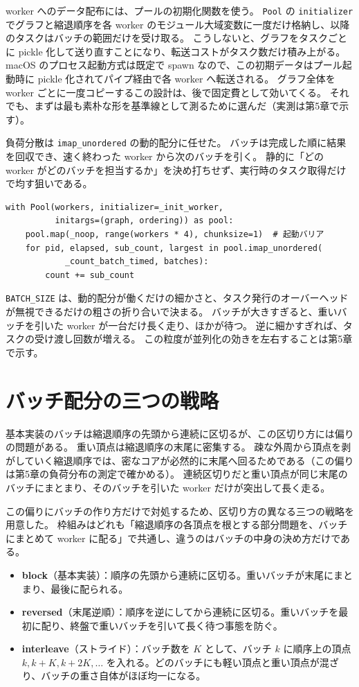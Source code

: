 worker へのデータ配布には、プールの初期化関数を使う。
\verb|Pool| の \verb|initializer| でグラフと縮退順序を各 worker のモジュール大域変数に一度だけ格納し、以降のタスクはバッチの範囲だけを受け取る。
こうしないと、グラフをタスクごとに pickle 化して送り直すことになり、転送コストがタスク数だけ積み上がる。
macOS のプロセス起動方式は既定で spawn なので、この初期データはプール起動時に pickle 化されてパイプ経由で各 worker へ転送される。
グラフ全体を worker ごとに一度コピーするこの設計は、後で固定費として効いてくる。
それでも、まずは最も素朴な形を基準線として測るために選んだ（実測は第5章で示す）。

負荷分散は \verb|imap_unordered| の動的配分に任せた。
バッチは完成した順に結果を回収でき、速く終わった worker から次のバッチを引く。
静的に「どの worker がどのバッチを担当するか」を決め打ちせず、実行時のタスク取得だけで均す狙いである。

\begin{verbatim}
with Pool(workers, initializer=_init_worker,
          initargs=(graph, ordering)) as pool:
    pool.map(_noop, range(workers * 4), chunksize=1)  # 起動バリア
    for pid, elapsed, sub_count, largest in pool.imap_unordered(
            _count_batch_timed, batches):
        count += sub_count
\end{verbatim}

\verb|BATCH_SIZE| は、動的配分が働くだけの細かさと、タスク発行のオーバーヘッドが無視できるだけの粗さの折り合いで決まる。
バッチが大きすぎると、重いバッチを引いた worker が一台だけ長く走り、ほかが待つ。
逆に細かすぎれば、タスクの受け渡し回数が増える。
この粒度が並列化の効きを左右することは第5章で示す。

\section{バッチ配分の三つの戦略}

基本実装のバッチは縮退順序の先頭から連続に区切るが、この区切り方には偏りの問題がある。
重い頂点は縮退順序の末尾に密集する。
疎な外周から頂点を剥がしていく縮退順序では、密なコアが必然的に末尾へ回るためである（この偏りは第5章の負荷分布の測定で確かめる）。
連続区切りだと重い頂点が同じ末尾のバッチにまとまり、そのバッチを引いた worker だけが突出して長く走る。

この偏りにバッチの作り方だけで対処するため、区切り方の異なる三つの戦略を用意した。
枠組みはどれも「縮退順序の各頂点を根とする部分問題を、バッチにまとめて worker に配る」で共通し、違うのはバッチの中身の決め方だけである。

\begin{itemize}
\item \textbf{block}（基本実装）：順序の先頭から連続に区切る。重いバッチが末尾にまとまり、最後に配られる。
\item \textbf{reversed}（末尾逆順）：順序を逆にしてから連続に区切る。重いバッチを最初に配り、終盤で重いバッチを引いて長く待つ事態を防ぐ。
\item \textbf{interleave}（ストライド）：バッチ数を $K$ として、バッチ $k$ に順序上の頂点 $k, k+K, k+2K, \dots$ を入れる。どのバッチにも軽い頂点と重い頂点が混ざり、バッチの重さ自体がほぼ均一になる。
\end{itemize}

